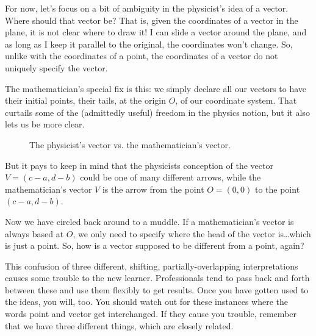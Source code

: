 \documentclass[00-livre-main.tex]{subfiles}
\begin{document}
For now, let's focus on a bit of ambiguity in the physicist's idea of a vector. 
Where should that vector be?
That is, given the coordinates of a vector in the plane, it is not clear where to draw it!
I can slide a vector around the plane, and as long as I keep it parallel to the original, the coordinates won't change. 
So, unlike with the coordinates of a point, the coordinates of a vector do not uniquely specify the vector.

The mathematician's special fix is this: we simply declare all our vectors to have their initial points, their tails, at the origin $O$, of our coordinate system.
That curtails some of the (admittedly useful) freedom in the physics notion, but it also lets us be more clear.

\begin{figure}[h]
\centering
{}
\caption{The physicist's vector vs. the mathematician's vector.}
\end{figure}

But it pays to keep in mind that the physicists conception of the vector $V = (c-a,d-b)$ could be one of many different arrows, while the mathematician's vector $V$ is the arrow from the point $O = (0,0)$ to the point $(c-a, d-b)$.

Now we have circled back around to a muddle. If a mathematician's vector is always based at $O$, we only need to specify where the head of the vector is\dots which is just a point. So, how is a vector supposed to be different from a point, again? 

This confusion of three different, shifting, partially-overlapping interpretations causes some trouble to the new learner. Professionals tend to pass back and forth between these and use them flexibly to get results. Once you have gotten used to the ideas, you will, too. You should watch out for these instances where the words point and vector get interchanged. If they cause you trouble, remember that we have three different things, which are closely related.
\end{document}
